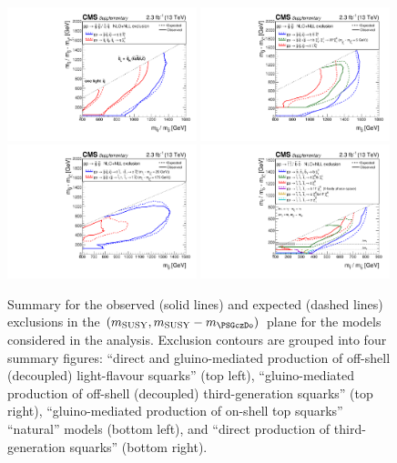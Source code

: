 \clearpage
\begin{figure}[!h]
  \begin{center}
    \includegraphics[width=0.49\textwidth]{Supplementary/mixSUMMARY_transposed_aux}
    \includegraphics[width=0.49\textwidth]{Supplementary/gluinoSUMMARY_transposed_aux} \\
    \includegraphics[width=0.49\textwidth]{Supplementary/naturalSUMMARY_transposed_aux}
    \includegraphics[width=0.49\textwidth]{Supplementary/allThirdGenSUMMARY_transposed_aux} \\
    \caption{Summary for the observed (solid lines) and expected
      (dashed lines) exclusions in the 
      $(m_{\mathrm{SUSY}}, m_{\mathrm{SUSY}} - m_{\PSGczDo})$ plane for
      the models considered in the analysis. Exclusion contours are
      grouped into four summary figures: 
       ``direct and gluino-mediated production of off-shell
       (decoupled) light-flavour squarks'' (top left), 
       ``gluino-mediated production of off-shell (decoupled)
       third-generation squarks'' (top right), ``gluino-mediated
       production of on-shell top squarks'' \ie ``natural'' models
       (bottom left), and ``direct production of third-generation 
       squarks'' (bottom right). 
       \label{fig:summary-excl-plots} }
  \end{center}
\end{figure}


